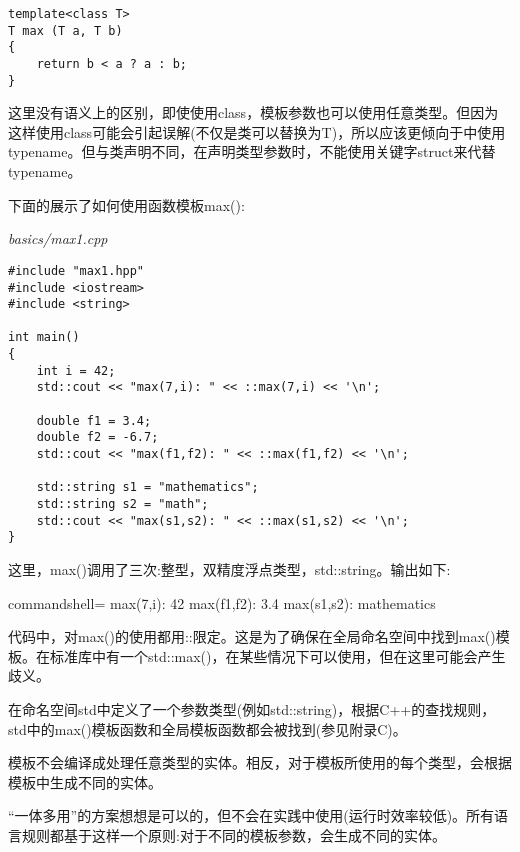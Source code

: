 \begin{lstlisting}[style=styleCXX]
template<class T>
T max (T a, T b)
{
	return b < a ? a : b;
}
\end{lstlisting}

这里没有语义上的区别，即使使用class，模板参数也可以使用任意类型。但因为这样使用class可能会引起误解(不仅是类可以替换为T)，所以应该更倾向于中使用typename。但与类声明不同，在声明类型参数时，不能使用关键字struct来代替typename。


下面的展示了如何使用函数模板max():

\noindent
\textit{basics/max1.cpp}
\begin{lstlisting}[style=styleCXX]
#include "max1.hpp"
#include <iostream>
#include <string>

int main()
{
	int i = 42;
	std::cout << "max(7,i): " << ::max(7,i) << '\n';
	
	double f1 = 3.4;
	double f2 = -6.7;
	std::cout << "max(f1,f2): " << ::max(f1,f2) << '\n';
	
	std::string s1 = "mathematics";
	std::string s2 = "math";
	std::cout << "max(s1,s2): " << ::max(s1,s2) << '\n';
}
\end{lstlisting}

这里，max()调用了三次:整型，双精度浮点类型，std::string。输出如下:

\begin{tcblisting}{commandshell={}}
max(7,i): 42
max(f1,f2): 3.4
max(s1,s2): mathematics
\end{tcblisting}

代码中，对max()的使用都用::限定。这是为了确保在全局命名空间中找到max()模板。在标准库中有一个std::max()，在某些情况下可以使用，但在这里可能会产生歧义。

\begin{tcolorbox}[colback=webgreen!5!white,colframe=webgreen!75!black]
\hspace*{0.75cm}在命名空间std中定义了一个参数类型(例如std::string)，根据C++的查找规则，std中的max()模板函数和全局模板函数都会被找到(参见附录C)。
\end{tcolorbox}

模板不会编译成处理任意类型的实体。相反，对于模板所使用的每个类型，会根据模板中生成不同的实体。

\begin{tcolorbox}[colback=webgreen!5!white,colframe=webgreen!75!black]
\hspace*{0.75cm}“一体多用”的方案想想是可以的，但不会在实践中使用(运行时效率较低)。所有语言规则都基于这样一个原则:对于不同的模板参数，会生成不同的实体。
\end{tcolorbox}

